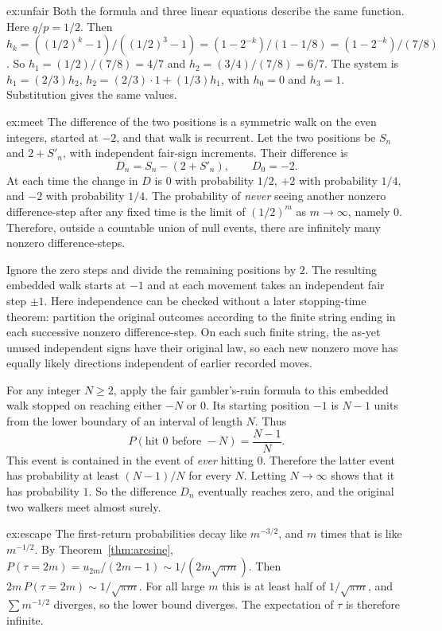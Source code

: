 \begin{solution}{ex:unfair}
\idea Both the formula and three linear equations describe the same function.
\writeup Here $q/p=1/2$. Then $h_k=((1/2)^k-1)/((1/2)^3-1)=(1-2^{-k})/(1-1/8)=(1-2^{-k})/(7/8)$. So $h_1=(1/2)/(7/8)=4/7$ and $h_2=(3/4)/(7/8)=6/7$. The system is $h_1=(2/3)h_2$, $h_2=(2/3)\cdot1+(1/3)h_1$, with $h_0=0$ and $h_3=1$. Substitution gives the same values.
\end{solution}

\begin{solution}{ex:meet}
\idea The difference of the two positions is a symmetric walk on the even integers, started at $-2$, and that walk is recurrent.
\writeup Let the two positions be $S_n$ and $2+S'_n$, with independent fair-sign increments. Their difference is
\[
 D_n=S_n-(2+S'_n),\qquad D_0=-2.
\]
At each time the change in $D$ is $0$ with probability $1/2$, $+2$ with probability $1/4$, and $-2$ with probability $1/4$. The probability of \emph{never} seeing another nonzero difference-step after any fixed time is the limit of $(1/2)^m$ as $m\to\infty$, namely $0$. Therefore, outside a countable union of null events, there are infinitely many nonzero difference-steps.

Ignore the zero steps and divide the remaining positions by $2$. The resulting embedded walk starts at $-1$ and at each movement takes an independent fair step $\pm1$. Here independence can be checked without a later stopping-time theorem: partition the original outcomes according to the finite string ending in each successive nonzero difference-step. On each such finite string, the as-yet unused independent signs have their original law, so each new nonzero move has equally likely directions independent of earlier recorded moves.

For any integer $N\ge2$, apply the fair gambler's-ruin formula to this embedded walk stopped on reaching either $-N$ or $0$. Its starting position $-1$ is $N-1$ units from the lower boundary of an interval of length $N$. Thus
\[
 P(\text{hit }0\text{ before }-N)=\frac{N-1}{N}.
\]
This event is contained in the event of \emph{ever} hitting $0$. Therefore the latter event has probability at least $(N-1)/N$ for every $N$. Letting $N\to\infty$ shows that it has probability $1$. So the difference $D_n$ eventually reaches zero, and the original two walkers meet almost surely.
\end{solution}

\begin{solution}{ex:escape}
\idea The first-return probabilities decay like $m^{-3/2}$, and $m$ times that is like $m^{-1/2}$.
\writeup By Theorem~\ref{thm:arcsine}, $P(\tau=2m)=u_{2m}/(2m-1)\sim 1/(2m\sqrt{\pi m})$. Then $2m\,P(\tau=2m)\sim 1/\sqrt{\pi m}$. For all large $m$ this is at least half of $1/\sqrt{\pi m}$, and $\sum m^{-1/2}$ diverges, so the lower bound diverges. The expectation of $\tau$ is therefore infinite.
\end{solution}

